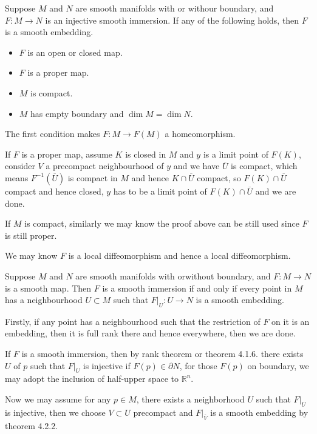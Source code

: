 \begin{proposition}
    Suppose $M$ and $N$ are smooth manifolds with or withour boundary, and $F:M\to N$ is an injective smooth immersion. If any of the following holds, then $F$ is a smooth embedding.
    \begin{itemize}
        \item $F$ is an open or closed map.
        \item $F$ is a proper map.
        \item $M$ is compact.
        \item $M$ has empty boundary and $\dim M = \dim N$.
    \end{itemize}
\end{proposition}
\Pf\par
    The first condition makes $F:M\to F(M)$ a homeomorphism.\par
    If $F$ is a proper map, assume $K$ is closed in $M$ and $y$ is a limit point of $F(K)$, consider $V$ a precompact neighbourhood of $y$ and we have $\overline{U}$ is compact, which means $F^{-1}(\overline{U})$ is compact in $M$ and hence $K\cap \overline{U}$ compact, so $F(K)\cap \overline{U}$ compact and hence closed, $y$ has to be a limit point of $F(K)\cap \overline{U}$ and we are done.\par
    If $M$ is compact, similarly we may know the proof above can be still used since $F$ is still proper.\par
    We may know $F$ is a local diffeomorphism and hence a local diffeomorphism. 


\begin{theorem}
    Suppose $M$ and $N$ are smooth manifolds with orwithout boundary, and $F:M\to N$ is a smooth map. Then $F$ is a smooth immersion if and only if every point in $M$ has a neighbourhood $U\subset M$ such that $F|_U:U\to N$ is a smooth embedding.
\end{theorem}
\Pf\par
    Firstly, if any point has a neighbourhood such that the restriction of $F$ on it is an embedding, then it is full rank there and hence everywhere, then we are done.\par
    If $F$ is a smooth immersion, then by rank theorem or theorem 4.1.6. there exists $U$ of $p$ such that $F|_{U}$ is injective if $F(p) \in \partial N$, for those $F(p)$ on boundary, we may adopt the inclusion of half-upper space to $\mathbb{R}^n$.\par
    Now we may assume for any $p\in M$, there exists a neighborhood $U$ such that $F|_U$ is injective, then we choose $V\subset U$ precompact and $F|_{\overline{V}}$ is a smooth embedding by theorem 4.2.2.


